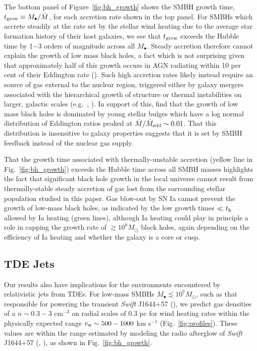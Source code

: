 \documentclass[usenatbib,fleqn]{mn2e}
\newcommand{\Mdot}{\dot{M}}
\begin{document}
The bottom panel of Figure~\ref{fig:bh_growth} shows the SMBH growth
time, $t_{\rm grow} \equiv M_{\bullet}/\dot{M}$, for each accretion rate
shown in the top panel.  For SMBHs which accrete steadily at the rate set by the
stellar wind heating due to the average star formation
history of their host galaxies, we see that $t_{\rm grow}$ exceeds the
Hubble time by 1$-$3 orders of magnitude across all $M_{\bullet}$.
Steady accretion therefore cannot explain the growth of low mass black
holes, a fact which is not surprising given that approximately half of
this growth occurs in AGN radiating within 10 per cent of their
Eddington rate (\citealt{Heckman+04}).  Such high accretion rates
likely instead require an source of gas external to the nuclear
region, triggered either by galaxy mergers associated with the
hierarchical growth of structure or thermal instabilities on larger,
galactic scales (e.g.~\citealt{Ciotti+10}, \citealt{Voit+15}).  In support of this,
\citet{Kauffmann&Heckman09} find that the growth of low mass black
holes is dominated by young stellar bulges which have a log normal
distribution of Eddington ratios peaked at $\Mdot/\dot{M}_{\rm edd} \sim
0.01$. That this distribution is insensitive to galaxy properties
suggests that it is set by SMBH feedback instead of the nuclear gas
supply.

That the growth time associated with thermally-unstable accretion
(yellow line in Fig.~\ref{fig:bh_growth}) exceeds the Hubble time across all SMBH masses
highlights the fact that significant black hole growth in the local
universe cannot result from thermally-stable steady accretion of gas
lost from the surrounding stellar population studied in this paper.
Gas blow-out by SN Ia cannot prevent the growth of low-mass black
holes, as indicated by the low growth times $\ll t_{\rm h}$ allowed by
Ia heating (green lines), although Ia heating could play in principle
a role in capping the growth rate of $\gtrsim 10^{8}M_{\odot}$ black
holes, again depending on the efficiency of Ia heating and whether the
galaxy is a core or cusp.


\subsection{TDE Jets}
\label{sec:TDE}

Our results also have implications for the environments encountered by
relativistic jets from TDEs.  For low-mass SMBHs $M_{\bullet} \lesssim
10^{7}M_{\odot}$, such as that responsible for powering the transient {\it Swift}
J1644+57 (\citealt{Bloom+11}), we predict gas densities of a $n
\sim 0.3-3$ cm$^{-3}$ on radial scales of 0.3 pc for wind heating
rates within the physically expected range $v_{\rm w} \sim 500-1000$
km s$^{-1}$ (Fig.~\ref{fig:profiles}).  These values are within the
range estimated by modeling the radio afterglow of {\it Swift}
J1644+57 (\citealt{Metzger+12}, \citealt{BergerZauderer+:2012a}), as shown in Fig.~\ref{fig:bh_growth}.
\end{document}
